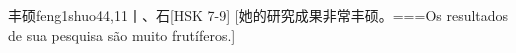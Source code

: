 \begin{EntryWithPhonetic}{丰硕}{feng1shuo4}{4,11}{⼁、⽯}[HSK 7-9]
  [她的研究成果非常丰硕。===Os resultados de sua pesquisa são muito frutíferos.]
\end{EntryWithPhonetic}
